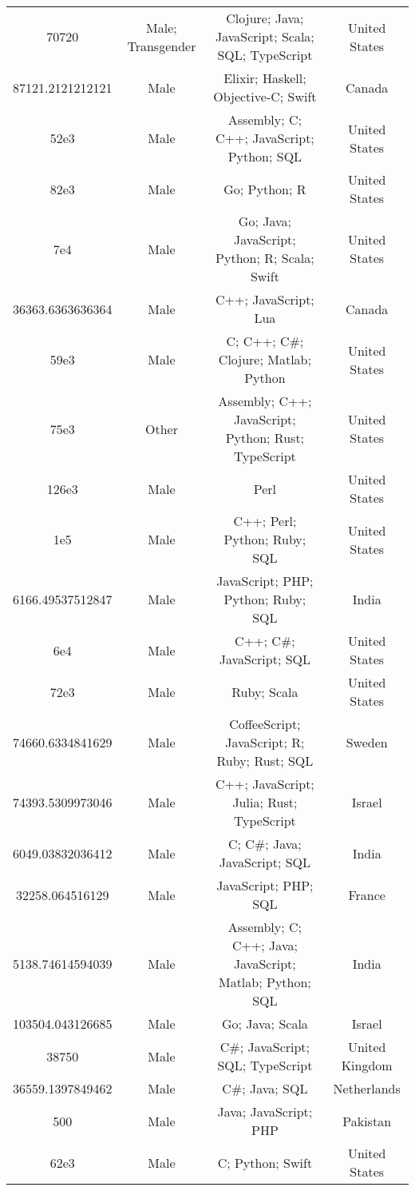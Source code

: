 \begin{center}
\begin{tabular}{ |c|c|c|c| }
70720  &  Male; Transgender  &  Clojure; Java; JavaScript; Scala; SQL; TypeScript  &  United States  \\ 
87121.2121212121  &  Male  &  Elixir; Haskell; Objective-C; Swift  &  Canada  \\ 
52e3  &  Male  &  Assembly; C; C++; JavaScript; Python; SQL  &  United States  \\ 
82e3  &  Male  &  Go; Python; R  &  United States  \\ 
7e4  &  Male  &  Go; Java; JavaScript; Python; R; Scala; Swift  &  United States  \\ 
36363.6363636364  &  Male  &  C++; JavaScript; Lua  &  Canada  \\ 
59e3  &  Male  &  C; C++; C\#; Clojure; Matlab; Python  &  United States  \\ 
75e3  &  Other  &  Assembly; C++; JavaScript; Python; Rust; TypeScript  &  United States  \\ 
126e3  &  Male  &  Perl  &  United States  \\ 
1e5  &  Male  &  C++; Perl; Python; Ruby; SQL  &  United States  \\ 
6166.49537512847  &  Male  &  JavaScript; PHP; Python; Ruby; SQL  &  India  \\ 
6e4  &  Male  &  C++; C\#; JavaScript; SQL  &  United States  \\ 
72e3  &  Male  &  Ruby; Scala  &  United States  \\ 
74660.6334841629  &  Male  &  CoffeeScript; JavaScript; R; Ruby; Rust; SQL  &  Sweden  \\ 
74393.5309973046  &  Male  &  C++; JavaScript; Julia; Rust; TypeScript  &  Israel  \\ 
6049.03832036412  &  Male  &  C; C\#; Java; JavaScript; SQL  &  India  \\ 
32258.064516129  &  Male  &  JavaScript; PHP; SQL  &  France  \\ 
5138.74614594039  &  Male  &  Assembly; C; C++; Java; JavaScript; Matlab; Python; SQL  &  India  \\ 
103504.043126685  &  Male  &  Go; Java; Scala  &  Israel  \\ 
38750  &  Male  &  C\#; JavaScript; SQL; TypeScript  &  United Kingdom  \\ 
36559.1397849462  &  Male  &  C\#; Java; SQL  &  Netherlands  \\ 
500  &  Male  &  Java; JavaScript; PHP  &  Pakistan  \\ 
62e3  &  Male  &  C; Python; Swift  &  United States  \\ 

\end{tabular}
\end{center}
